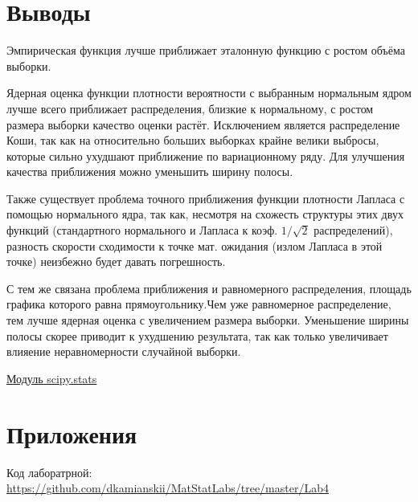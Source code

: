 \documentclass[a4]{article}
\begin{document}
\section{Выводы}
\par Эмпирическая функция лучше приближает эталонную функцию с ростом объёма выборки.

\par Ядерная оценка функции плотности вероятности с выбранным нормальным ядром лучше всего приближает распределения, близкие к нормальному, с ростом размера выборки качество оценки растёт. Исключением является распределение Коши, так как на относительно больших выборках крайне велики выбросы, которые сильно ухудшают приближение по вариационному ряду. Для улучшения качества приближения можно уменьшить ширину полосы.
\par Также существует проблема точного приближения функции плотности Лапласа с помощью нормального ядра, так как, несмотря на схожесть структуры этих двух функций (стандартного нормального и Лапласа к коэф. $ 1/\sqrt{2} $ распределений), разность скорости сходимости к точке мат. ожидания (излом Лапласа в этой точке) неизбежно будет давать погрешность. 
\par С тем же связана проблема приближения и равномерного распределения, площадь графика которого равна прямоугольнику.Чем уже равномерное распределение, тем лучше ядерная оценка с увеличением размера выборки. Уменьшение ширины полосы скорее приводит к ухудшению результата, так как только увеличивает влияение неравномерности случайной выборки.    

\begin{thebibliography}{}    
    \href{https://docs.scipy.org/doc/scipy/reference/stats.html}{Модуль scipy.stats}\\
\end{thebibliography}

\section{Приложения}


Код лаборатрной:\; \url{https://github.com/dkamianskii/MatStatLabs/tree/master/Lab4}
\end{document}
